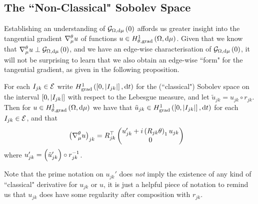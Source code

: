 \subsection{The ``Non-Classical" Sobolev Space} \label{appS:SobSpacesTheory}
Establishing an understanding of $\mathcal{G}_{ \Omega, \mathrm{d}\mu}\left( 0 \right)$  affords us greater insight into the tangential gradient $\nabla^{\theta}_\mu u$ of functions $u\in H^1_{\theta, \mathrm{grad}}\left( \Omega, \mathrm{d}\mu \right)$.
Given that we know that $\nabla^{\theta}_\mu u \perp \mathcal{G}_{ \Omega, \mathrm{d}\mu}\left( 0 \right)$, and we have an edge-wise characterisation of $\mathcal{G}_{ \Omega, \mathrm{d}\mu}\left( 0 \right)$, it will not be surprising to learn that we also obtain an edge-wise ``form" for the tangential gradient, as given in the following proposition.
\begin{prop} \label{prop:GraphTangGrad}
	For each $I_{jk}\in \mathcal{E}$ write $H^1_\mathrm{grad}\left( \left[ 0,\left\lvert I_{jk} \right\rvert \right], \mathrm{d}t \right)$ for the (``classical") Sobolev space on the interval $\left[ 0,\left\lvert I_{jk} \right\rvert \right]$ with respect to the Lebesgue measure, and let $\tilde{u}_{jk} = u_{jk} \circ r_{jk}$.
	Then for $u\in H^1_{\theta, \mathrm{grad}}\left( \Omega, \mathrm{d}\mu \right)$ we have that $\tilde{u}_{jk}\in H^1_\mathrm{grad}\left( \left[ 0,\left\lvert I_{jk} \right\rvert \right], \mathrm{d}t \right)$ for each $I_{jk}\in \mathcal{E}$, and that
	\begin{align*}
		\left(  \nabla^{\theta}_\mu u  \right)_{jk} 
		&= R_{jk}^\top \begin{pmatrix} u_{jk}' + i\left( R_{jk}\theta \right)_1 u_{jk} \\ 0	\end{pmatrix}
	\end{align*}
	where $u_{jk}' = \left(  \tilde{u}_{jk}'  \right) \circ r_{jk}^{-1}$.
\end{prop}
Note that the prime notation on $u_{jk}'$ does \emph{not} imply the existence of any kind of ``classical" derivative for $u_{jk}$ or $u$, it is just a helpful piece of notation to remind us that $u_{jk}$ does have some regularity after composition with $r_{jk}$.
